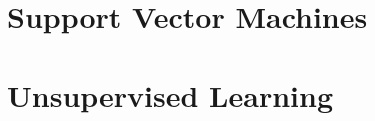 \documentclass[a4paper,12pt,titlepage]{article} %
\begin{document}
\newpage
\section{Support Vector Machines}


\newpage
\section{Unsupervised Learning}


\newpage
\listoftables

\newpage
\listoffigures

\end{document}
